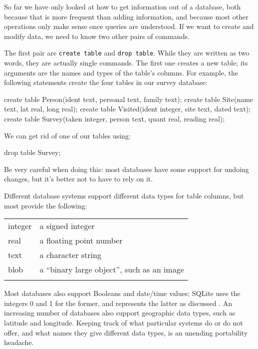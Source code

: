 \documentclass{book}
\begin{document}
So far we have only looked at how to get information out of a database,
both because that is more frequent than adding information, and because
most other operations only make sense once queries are understood. If we
want to create and modify data, we need to know two other pairs of
commands.

The first pair are \texttt{create table} and \texttt{drop table}. While
they are written as two words, they are actually single commands. The
first one creates a new table; its arguments are the names and types of
the table's columns. For example, the following statements create the
four tables in our survey database:

\begin{VerbIn}
create table Person(ident text, personal text, family text);
create table Site(name text, lat real, long real);
create table Visited(ident integer, site text, dated text);
create table Survey(taken integer, person text, quant real, reading real);
\end{VerbIn}

We can get rid of one of our tables using:

\begin{VerbIn}
drop table Survey;
\end{VerbIn}

Be very careful when doing this: most databases have some support for
undoing changes, but it's better not to have to rely on it.

Different database systems support different data types for table
columns, but most provide the following:

\begin{tabular}{ll}
\hline\noalign{\medskip}
integer & a signed integer
\\\noalign{\medskip}
real & a floating point number
\\\noalign{\medskip}
text & a character string
\\\noalign{\medskip}
blob & a ``binary large object'', such as an image
\\\noalign{\medskip}
\hline
\end{tabular}

Most databases also support Booleans and date/time values; SQLite uses
the integers 0 and 1 for the former, and represents the latter as
discussed . An increasing number of databases
also support geographic data types, such as latitude and longitude.
Keeping track of what particular systems do or do not offer, and what
names they give different data types, is an unending portability
headache.
\end{document}
